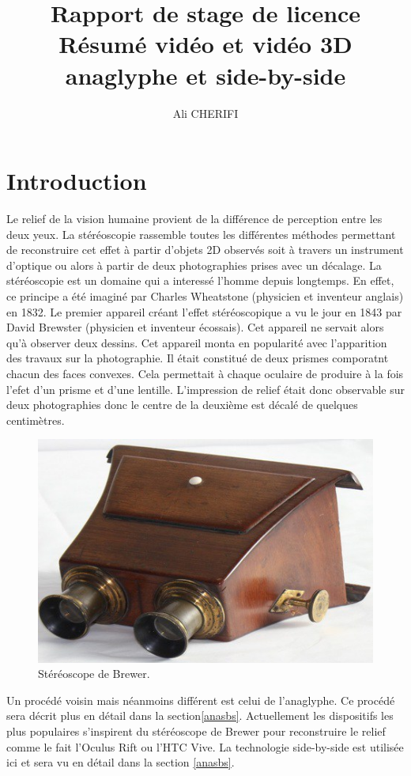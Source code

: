 \documentclass[10pt,a4paper]{article}
\author{Ali CHERIFI}
\title{Rapport de stage de licence\\Résumé vidéo et vidéo 3D anaglyphe et side-by-side}
\begin{document}
\maketitle
\newpage
\tableofcontents
\newpage
\section{Introduction}
Le relief de la vision humaine provient de la différence de perception entre les deux yeux. La stéréoscopie rassemble toutes les différentes méthodes permettant de reconstruire cet effet à partir d'objets 2D
observés soit à travers un instrument d'optique ou alors à partir de deux photographies prises avec un décalage.
La stéréoscopie est un domaine qui a interessé l'homme depuis longtemps. En effet, ce principe a été imaginé par Charles Wheatstone\cite{stereoscopie} (physicien et inventeur anglais) en 1832.
Le premier appareil créant l'effet stéréoscopique a vu le jour en 1843 par David Brewster (physicien et inventeur écossais). Cet appareil ne servait alors qu'à observer deux dessins.
Cet appareil monta en popularité avec l'apparition des travaux sur la photographie. Il était constitué de deux prismes comporatnt chacun des faces convexes. Cela permettait à chaque oculaire de
produire à la fois l'efet d'un prisme et d'une lentille. L'impression de relief était donc observable sur deux photographies donc le centre de la deuxième est décalé de quelques centimètres.

\begin{figure}[!h]
\center
\includegraphics[scale = 0.5]{brewer.jpg}
\caption{Stéréoscope de Brewer.}
\end{figure}

Un procédé voisin mais néanmoins différent est celui de l'anaglyphe. Ce procédé sera décrit plus en détail dans la section\ref{anasbs}.
Actuellement les dispositifs les plus populaires s'inspirent du stéréoscope de Brewer pour reconstruire le relief comme le fait l'Oculus Rift ou l'HTC Vive. La technologie side-by-side est utilisée ici et
sera vu en détail dans la section \ref{anasbs}.
\end{document}
